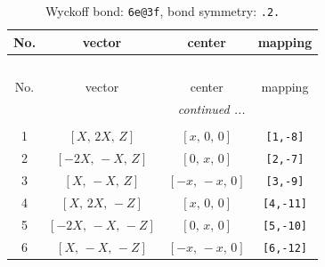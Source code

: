 \documentclass[fleqn,8pt]{jsarticle}
\begin{document}
\renewcommand{\arraystretch}{1.2}
\begin{longtable}{cccc}
\caption{Wyckoff bond: {\tt 6e@3f}, bond symmetry: {\tt .2.}}
 \\
 \hline \hline
No. & vector & center & mapping \\ \hline \endfirsthead

\multicolumn{3}{l}{\tablename\ \thetable{}} \\
 \hline \hline
No. & vector & center & mapping \\ \hline \endhead

 \hline \hline
\multicolumn{3}{r}{\footnotesize\it continued ...} \\ \endfoot

 \hline \hline
\multicolumn{3}{r}{} \\ \endlastfoot

1 & $\left[ X,\, 2 X,\, Z \right]$ & $\left[ x,\, 0,\, 0 \right]$ & {\tt [1,-8]} \\ \hline
2 & $\left[ - 2 X,\, - X,\, Z \right]$ & $\left[ 0,\, x,\, 0 \right]$ & {\tt [2,-7]} \\ \hline
3 & $\left[ X,\, - X,\, Z \right]$ & $\left[ - x,\, - x,\, 0 \right]$ & {\tt [3,-9]} \\ \hline
4 & $\left[ X,\, 2 X,\, - Z \right]$ & $\left[ x,\, 0,\, 0 \right]$ & {\tt [4,-11]} \\ \hline
5 & $\left[ - 2 X,\, - X,\, - Z \right]$ & $\left[ 0,\, x,\, 0 \right]$ & {\tt [5,-10]} \\ \hline
6 & $\left[ X,\, - X,\, - Z \right]$ & $\left[ - x,\, - x,\, 0 \right]$ & {\tt [6,-12]} \\
\end{longtable}
\renewcommand{\arraystretch}{1.2}
\end{document}

